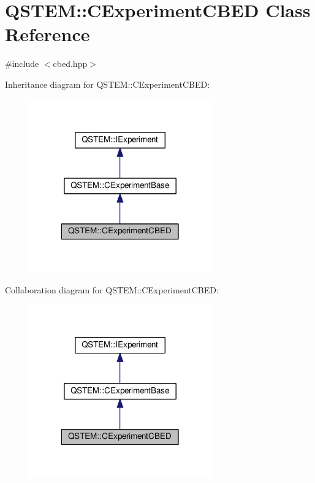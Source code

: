 \hypertarget{class_q_s_t_e_m_1_1_c_experiment_c_b_e_d}{\section{Q\-S\-T\-E\-M\-:\-:C\-Experiment\-C\-B\-E\-D Class Reference}
\label{class_q_s_t_e_m_1_1_c_experiment_c_b_e_d}
}


{\ttfamily \#include $<$cbed.\-hpp$>$}



Inheritance diagram for Q\-S\-T\-E\-M\-:\-:C\-Experiment\-C\-B\-E\-D\-:
\nopagebreak
\begin{figure}[H]
\begin{center}
\leavevmode
\includegraphics[width=222pt]{class_q_s_t_e_m_1_1_c_experiment_c_b_e_d__inherit__graph}
\end{center}
\end{figure}


Collaboration diagram for Q\-S\-T\-E\-M\-:\-:C\-Experiment\-C\-B\-E\-D\-:
\nopagebreak
\begin{figure}[H]
\begin{center}
\leavevmode
\includegraphics[width=222pt]{class_q_s_t_e_m_1_1_c_experiment_c_b_e_d__coll__graph}
\end{center}
\end{figure}
